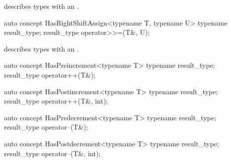 \documentclass[american,twoside]{book}
\begin{document}
\begin{itemdescr}
\pnum
\mbox{\reallynote} describes types with an \mbox{}.
\end{itemdescr}

\begin{itemdecl}
auto concept HasRightShiftAssign<typename T, typename U> {
  typename result_type;
  result_type operator>>=(T&, U);
}
\end{itemdecl}

\begin{itemdescr}
\pnum
\mbox{\reallynote} describes types with an \mbox{}.
\end{itemdescr}

\begin{itemdecl}
auto concept HasPreincrement<typename T> {
  typename result_type;
  result_type operator++(T&);
}
\end{itemdecl}

\begin{itemdescr}
\pnum
{}
\end{itemdescr}

\begin{itemdecl}
auto concept HasPostincrement<typename T> {
  typename result_type;
  result_type operator++(T&, int);
}
\end{itemdecl}

\begin{itemdescr}
\pnum
{}
\end{itemdescr}

\begin{itemdecl}
auto concept HasPredecrement<typename T> {
  typename result_type;
  result_type operator--(T&);
}
\end{itemdecl}

\begin{itemdescr}
\pnum
{}
\end{itemdescr}

\begin{itemdecl}
auto concept HasPostdecrement<typename T> {
  typename result_type;
  result_type operator--(T&, int);
}
\end{itemdecl}

\begin{itemdescr}
\pnum
{}
\end{itemdescr}
\end{document}
